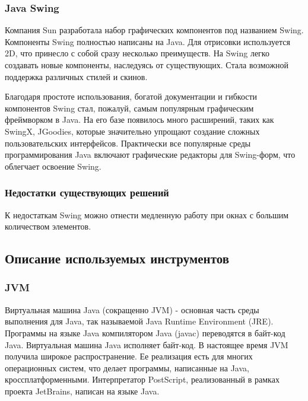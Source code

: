 \documentclass[14pt]{extarticle}
\begin{document}
		\subsubsection*{Java Swing}
				
				Компания Sun разработала набор графических компонентов под названием Swing. Компоненты Swing полностью написаны на Java. Для отрисовки используется 2D, что принесло с собой сразу несколько преимуществ. На Swing легко создавать новые компоненты, наследуясь от существующих. Стала возможной поддержка различных стилей и скинов. 

Благодаря простоте использования, богатой документации и гибкости компонентов Swing стал, пожалуй, самым популярным графическим фреймворком в Java. На его базе появилось много расширений, таких как SwingX, JGoodies, которые значительно упрощают создание сложных пользовательских интерфейсов. Практически все популярные среды программирования Java включают графические редакторы для Swing-форм, что облегчает освоение Swing.
		\subsubsection*{Недостатки существующих решений }
	
		К недостаткам Swing можно отнести медленную работу при окнах с большим количеством элементов.
		 
	\subsection{Описание используемых инструментов }
		
		\subsubsection*{JVM}
	
		Виртуальная машина Java (сокращенно JVM) - основная часть среды выполнения для Java, так называемой Java Runtime Environment (JRE). Программы на языке Java компилятором Java (javac) переводятся в байт-код Java. Виртуальная машина Java исполняет байт-код. В настоящее время JVM получила широкое распространение. Ее реализация есть для многих операционных систем, что делает программы, написанные на Java, кроссплатформенными. Интерпретатор PostScript, реализованный в рамках проекта JetBrains, написан на языке Java.
\end{document}
